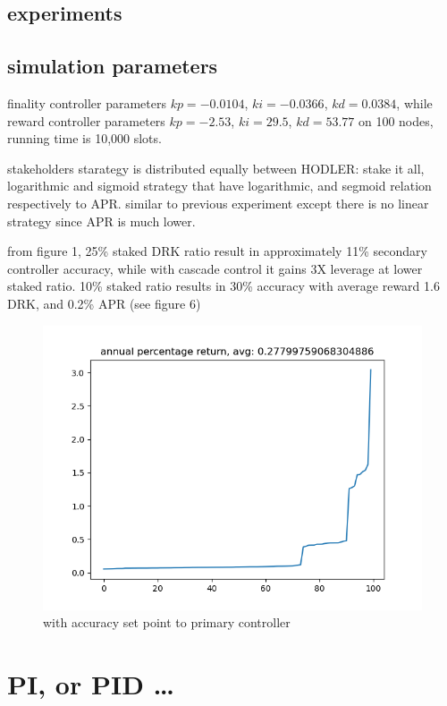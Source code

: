 \documentclass{article}
\begin{document}
\subsection {experiments}
\begin{description}
\subsection {simulation parameters}
\item finality controller parameters  $kp=-0.0104$, $ki=-0.0366$, $kd=0.0384$, while reward controller parameters  $kp=-2.53$, $ki=29.5$, $kd=53.77$ on 100 nodes, running time is 10,000 slots.
  \item stakeholders starategy is distributed equally between HODLER: stake it all,  logarithmic and sigmoid strategy that have logarithmic, and segmoid relation respectively to APR. similar to previous experiment except there is no linear strategy since APR is much lower.


\item from figure 1, 25\% staked DRK ratio result in approximately 11\% secondary controller accuracy, while with cascade control it gains 3X leverage at lower staked ratio. 10\% staked ratio results in 30\% accuracy with average reward 1.6 DRK, and 0.2\% APR (see figure 6)
\end{description}
\begin{figure}
    \includegraphics{acc_setpoint_quarterstake.png}
    \caption{with accuracy set point to primary controller}
\end{figure}

\section {PI, or PID \dots}
\end{document}
